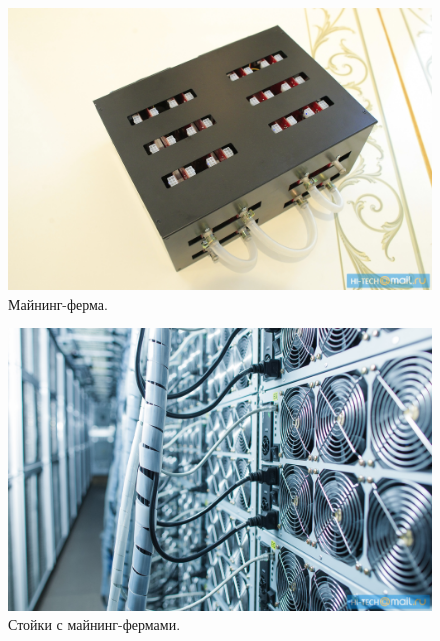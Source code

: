 \documentclass{beamer}
\begin{document}
\begin{frame}

\begin{figure}
\center
\includegraphics[width=\textwidth]{Images/mining03.jpg}
\caption{\label{fig:mine03}Майнинг-ферма.}
\end{figure}

\end{frame}

\begin{frame}

\begin{figure}
\center
\includegraphics[width=\textwidth]{Images/mining02.jpg}
\caption{\label{fig:mine02}Стойки с майнинг-фермами.}
\end{figure}

\end{frame}
\end{document}
